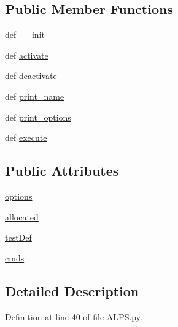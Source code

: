 \subsection*{Public Member Functions}
\begin{DoxyCompactItemize}
\item 
def \hyperlink{classALPS_1_1ALPS_a45417f6290435c66b3f3b7c4586915d9}{\-\_\-\-\_\-init\-\_\-\-\_\-}
\item 
def \hyperlink{classALPS_1_1ALPS_a3d507bd3feb505c8ed1b4e8f3729d636}{activate}
\item 
def \hyperlink{classALPS_1_1ALPS_aa1d63291a23bcca8ccbd44dc4d0fa6bf}{deactivate}
\item 
def \hyperlink{classALPS_1_1ALPS_a97e56ee7f5faaea26121d6ee0deeddab}{print\-\_\-name}
\item 
def \hyperlink{classALPS_1_1ALPS_a68c17d876ad850e44d40aa082b674f4e}{print\-\_\-options}
\item 
def \hyperlink{classALPS_1_1ALPS_af4b8efc64ea3abc5fb21fb93bfe052ff}{execute}
\end{DoxyCompactItemize}
\subsection*{Public Attributes}
\begin{DoxyCompactItemize}
\item 
\hyperlink{classALPS_1_1ALPS_a24dfa9b508f507c4cb6148f10a081555}{options}
\item 
\hyperlink{classALPS_1_1ALPS_ac371dce53e8c120f7031259025562bdb}{allocated}
\item 
\hyperlink{classALPS_1_1ALPS_a839c4f84a46683221d51004c08345ff2}{test\-Def}
\item 
\hyperlink{classALPS_1_1ALPS_a64bae95ba692ef4df06f716692b50ee9}{cmds}
\end{DoxyCompactItemize}


\subsection{Detailed Description}


Definition at line 40 of file A\-L\-P\-S.\-py.



